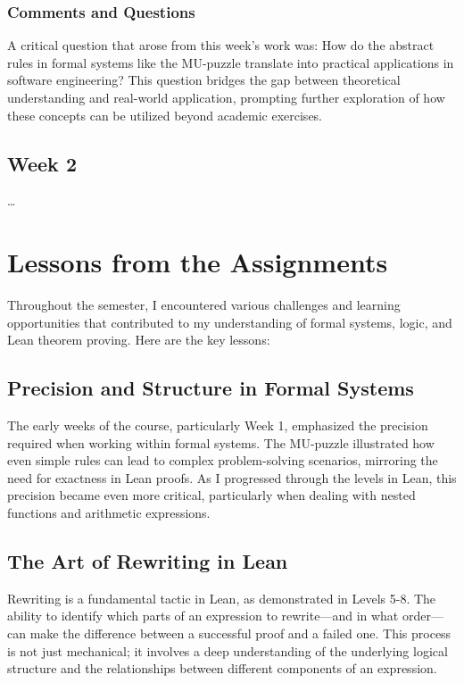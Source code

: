 \documentclass{article}
\theoremstyle{theorem}
\theoremstyle{definition}
\theoremstyle{remark}
\begin{document}
\subsubsection*{Comments and Questions}

A critical question that arose from this week's work was: How do the abstract rules in formal systems like the MU-puzzle translate into practical applications in software engineering? This question bridges the gap between theoretical understanding and real-world application, prompting further exploration of how these concepts can be utilized beyond academic exercises.

\subsection{Week 2}

\ldots

\section{Lessons from the Assignments}

Throughout the semester, I encountered various challenges and learning opportunities that contributed to my understanding of formal systems, logic, and Lean theorem proving. Here are the key lessons:

\subsection{Precision and Structure in Formal Systems}

The early weeks of the course, particularly Week 1, emphasized the precision required when working within formal systems. The MU-puzzle illustrated how even simple rules can lead to complex problem-solving scenarios, mirroring the need for exactness in Lean proofs. As I progressed through the levels in Lean, this precision became even more critical, particularly when dealing with nested functions and arithmetic expressions.

\subsection{The Art of Rewriting in Lean}

Rewriting is a fundamental tactic in Lean, as demonstrated in Levels 5-8. The ability to identify which parts of an expression to rewrite—and in what order—can make the difference between a successful proof and a failed one. This process is not just mechanical; it involves a deep understanding of the underlying logical structure and the relationships between different components of an expression.
\end{document}
